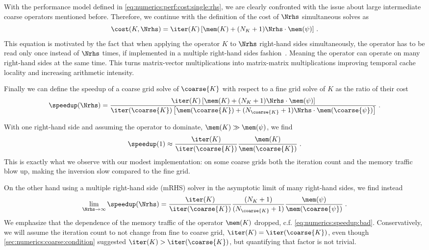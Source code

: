 With the performance model defined in \cref{eq:numerics:perf:cost:single:rhs}, we are clearly confronted with the issue about large intermediate coarse operators mentioned before.
Therefore, we continue with the definition of the cost of $\Nrhs$ simultaneous solves as
\begin{equation}
\cost(K, \Nrhs) = \iter(K) \left[ \mem(K) + (N_{K} + 1) \Nrhs \cdot \mem(\psi) \right] \,.
\end{equation}
This equation is motivated by the fact that when applying the operator $K$ to $\Nrhs$ right-hand sides simultaneously, the operator has to be read only once instead of $\Nrhs$ times, if implemented in a multiple right-hand sides fashion~\cite{Boyle:2024pio}.
Meaning the operator can operate on many right-hand sides at the same time.
This turns matrix-vector multiplications into matrix-matrix multiplications improving temporal cache locality and increasing arithmetic intensity.

Finally we can define the speedup of a coarse grid solve of $\coarse{K}$ with respect to a fine grid solve of $K$ as the ratio of their cost
\begin{equation}
\speedup(\Nrhs)
= \frac{
   \iter(K) \left[ \mem(K) + (N_{K} + 1) \Nrhs \cdot \mem(\psi) \right]
}{
   \iter(\coarse{K}) \left[ \mem(\coarse{K}) + (N_{\coarse{K}} + 1) \Nrhs \cdot \mem(\coarse{\psi}) \right]
} \;.
\end{equation}

With one right-hand side and assuming the operator to dominate, $\mem(K) \gg \mem(\psi)$, we find
\begin{equation} \label{eq:numerics:speedup:bad}
\speedup(1)
\approx \frac{ \iter(K) }{ \iter(\coarse{K}) }
  \frac{ \mem(K) }{ \mem(\coarse{K}) } \;.
\end{equation}
This is exactly what we observe with our modest implementation: on some coarse grids both the iteration count and the memory traffic blow up, making the inversion slow compared to the fine grid.

On the other hand using a multiple right-hand side (mRHS) solver in the asymptotic limit of many right-hand sides, we find instead
\begin{equation}
\lim_{\Nrhs \to \infty} \speedup(\Nrhs)
= \frac{ \iter(K) }{ \iter(\coarse{K}) }
\frac{ (N_{K} + 1) }{ (N_{\coarse{K}} + 1) }
  \frac{ \mem(\psi) }{ \mem(\coarse{\psi}) } \;.
\end{equation}
We emphasize that the dependence of the memory traffic of the operator $\mem(K)$ dropped, c.f. \cref{eq:numerics:speedup:bad}.
Conservatively, we will assume the iteration count to not change from fine to coarse grid, \ie $\iter(K) = \iter(\coarse{K})$, even though \cref{sec:numerics:coarse:condition} suggested $\iter(K) > \iter(\coarse{K})$, but quantifying that factor is not trivial.

